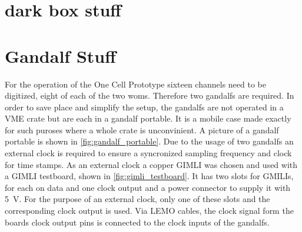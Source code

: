 \section{dark box stuff}


\section{Gandalf Stuff}

For the operation of the One Cell Prototype sixteen channels need to be digitized, eight of each of the two \acp{wom}.
Therefore two \acp{gandalf} are required.
In order to save place and simplify the setup, the \acp{gandalf} are not operated in a VME crate but are each in a \ac{gandalf} portable.
It is a mobile case made exactly for such puroses where a whole crate is unconvinient.
A picture of a \ac{gandalf} portable is shown in \autoref{fig:gandalf_portable}.
Due to the usage of two \acp{gandalf} an external clock is required to ensure a syncronized sampling frequency and clock for time stamps.
As an external clock a copper GIMLI was chosen and used with a GIMLI testboard, shown in \autoref{fig:gimli_testboard}.
It has two slots for GMILIs, for each on data and one clock output and a power connector to supply it with \SI{5}{\volt}.
For the purpose of an external clock, only one of these slots and the corresponding clock output is used.
Via LEMO cables, the clock signal form the boards clock output pins is connected to the clock inputs of the \acp{gandalf}.


